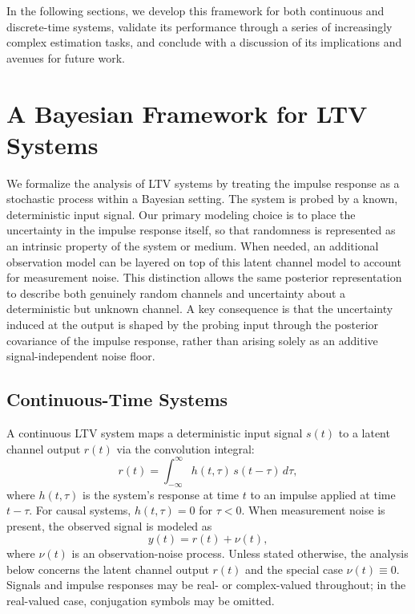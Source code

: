 \documentclass[preprint,1p,times,authoryear]{elsarticle}
\begin{document}
In the following sections, we develop this framework for both continuous and discrete-time systems, validate its performance through a series of increasingly complex estimation tasks, and conclude with a discussion of its implications and avenues for future work.

\section{A Bayesian Framework for LTV Systems}
\label{s:bayesian_framework}

We formalize the analysis of LTV systems by treating the impulse response as a stochastic process within a Bayesian setting. The system is probed by a known, deterministic input signal. Our primary modeling choice is to place the uncertainty in the impulse response itself, so that randomness is represented as an intrinsic property of the system or medium. When needed, an additional observation model can be layered on top of this latent channel model to account for measurement noise. This distinction allows the same posterior representation to describe both genuinely random channels and uncertainty about a deterministic but unknown channel. A key consequence is that the uncertainty induced at the output is shaped by the probing input through the posterior covariance of the impulse response, rather than arising solely as an additive signal-independent noise floor.

\subsection{Continuous-Time Systems}

A continuous LTV system maps a deterministic input signal $s(t)$ to a latent channel output $r(t)$ via the convolution integral:
\begin{equation}
r(t) = \int_{-\infty}^{\infty} h(t, \tau) \, s(t - \tau) \, d\tau,
\end{equation}
where $h(t, \tau)$ is the system's response at time $t$ to an impulse applied at time $t-\tau$. For causal systems, $h(t, \tau) = 0$ for $\tau < 0$. When measurement noise is present, the observed signal is modeled as
\begin{equation}
y(t) = r(t) + \nu(t),
\end{equation}
where $\nu(t)$ is an observation-noise process. Unless stated otherwise, the analysis below concerns the latent channel output $r(t)$ and the special case $\nu(t)\equiv 0$. Signals and impulse responses may be real- or complex-valued throughout; in the real-valued case, conjugation symbols may be omitted.
\end{document}
